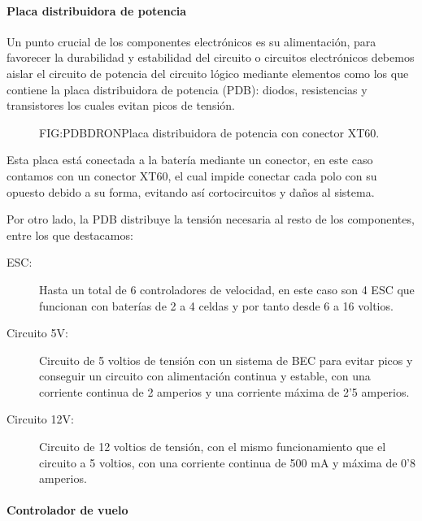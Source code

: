 \paragraph{Placa distribuidora de potencia}\label{SSS:PlacaDistribuidora}

Un punto crucial de los componentes electrónicos es su alimentación, para favorecer la durabilidad y estabilidad del circuito o circuitos electrónicos debemos aislar el circuito de potencia del circuito lógico mediante elementos como los que contiene la placa distribuidora de potencia (PDB): diodos, resistencias y transistores los cuales evitan picos de tensión.

\begin{figure}[Placa distribuidora de potencia]{FIG:PDBDRON}{Placa distribuidora de potencia con conector XT60.}
\end{figure}

Esta placa está conectada a la batería mediante un conector, en este caso contamos con un conector XT60, el cual impide conectar cada polo con su opuesto debido a su forma, evitando así cortocircuitos y daños al sistema.

Por otro lado, la PDB distribuye la tensión necesaria al resto de los componentes, entre los que destacamos:

\begin{description}
        \item[ESC:] Hasta un total de 6 controladores de velocidad, en este caso son 4 ESC que funcionan con baterías de 2 a 4 celdas y por tanto desde 6 a 16 voltios.
        \item [Circuito 5V:] Circuito de 5 voltios de tensión con un sistema de BEC para evitar picos y conseguir un circuito con alimentación continua y estable, con una corriente continua de 2 amperios y una corriente máxima de 2'5 amperios.
        \item [Circuito 12V:] Circuito de 12 voltios de tensión, con el mismo funcionamiento que el circuito a 5 voltios, con una corriente continua de 500 mA y máxima de 0'8 amperios.
\end{description}


\paragraph{Controlador de vuelo}
\label{SSS:Controlador de vuelo}


